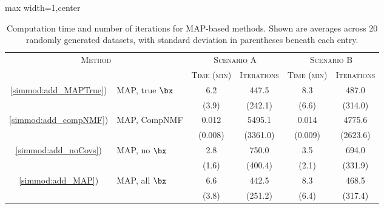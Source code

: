 \begin{table}[th]
\caption{Computation time and number of iterations for MAP-based methods. Shown are averages across 20 randomly generated datasets, with standard deviation in parentheses beneath each entry.}
\centering
\footnotesize
\begin{adjustbox}{max width=1\textwidth,center}
\begin{tabular}{|cl|cc|cc|}
\hline
 \multicolumn{2}{|c|}{\textsc{Method}} & \multicolumn{2}{c|}{\textsc{Scenario A}} & \multicolumn{2}{c|}{\textsc{Scenario B}} \\
& & \textsc{Time (min)} & \textsc{Iterations} & \textsc{Time (min)} & \textsc{Iterations} \\
\hline
\ref{simmod:add_MAPTrue}) & MAP, true $\bx$
  & 6.2  & 447.5
  & 8.3  & 487.0 \\
& & {\scriptsize (3.9)} & {\scriptsize (242.1)}
 & {\scriptsize (6.6)} & {\scriptsize (314.0)} \\
\hline
\ref{simmod:add_compNMF}) & MAP, CompNMF
  & 0.012  & 5495.1
  & 0.014  & 4775.6 \\
& & {\scriptsize (0.008)} & {\scriptsize (3361.0)}
 & {\scriptsize (0.009)} & {\scriptsize (2623.6)} \\
\hline
\ref{simmod:add_noCovs}) & MAP, no $\bx$
  & 2.8  & 750.0
  & 3.5  & 694.0 \\
& & {\scriptsize (1.6)} & {\scriptsize (400.4)}
 & {\scriptsize (2.1)} & {\scriptsize (331.9)} \\
\hline
\ref{simmod:add_MAP}) & MAP, all $\bx$
  & 6.6  & 442.5
  & 8.3  & 468.5 \\
& & {\scriptsize (3.8)} & {\scriptsize (251.2)}
 & {\scriptsize (6.4)} & {\scriptsize (317.4)} \\
\hline
\end{tabular}
\end{adjustbox}
\label{tab:sim_time_results}
\end{table}
